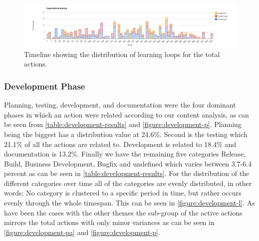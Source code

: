 \begin{figure}
	\centering
	\includegraphics[width=\textwidth, keepaspectratio]{figures/learning-l.png}
	\caption{Timeline showing the distribution of learning loops for the total actions.}
	\label{figure:learning-l}
\end{figure}
\afterpage{\clearpage}

\subsubsection{Development Phase}
\label{section:development-phase}
Planning, testing, development, and documentation were the four dominant phases in which an action were related according to our content analysis, as can be seen from \autoref{table:development-results} and \autoref{figure:development-p}. Planning being the biggest has a distribution value at 24.6\%. Second is the testing which 21.1\% of all the actions are related to. Development is related to 18.4\% and documentation is 13.2\%. Finally we have the remaining five categories Release, Build, Business Development, Bugfix and undefined which varies between 3.7-6.4 percent as can be seen in \autoref{table:development-results}. 
For the distribution of the different categories over time all of the categories are evenly distributed, in other words; No category is clustered to a specific period in time, but rather occurs evenly through the whole timespan. This can be seen in \autoref{figure:development-l}.
As have been the cases with the other themes the sub-group of the active actions mirrors the total actions with only minor variances as can be seen in \autoref{figure:development-pa} and \autoref{figure:development-p}.


